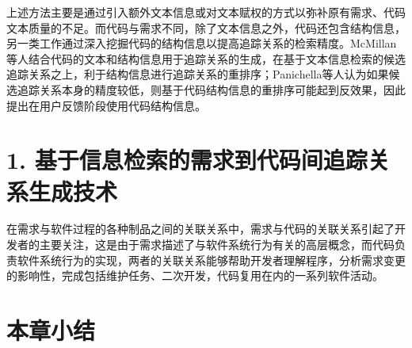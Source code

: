 上述方法主要是通过引入额外文本信息或对文本赋权的方式以弥补原有需求、代码文本质量的不足。而代码与需求不同，除了文本信息之外，代码还包含结构信息，另一类工作通过深入挖掘代码的结构信息以提高追踪关系的检索精度。McMillan等人\cite{mcmillan2009combining}结合代码的文本和结构信息用于追踪关系的生成，在基于文本信息检索的候选追踪关系之上，利于结构信息进行追踪关系的重排序；Panichella等人\cite{panichella2013and}认为如果候选追踪关系本身的精度较低，则基于代码结构信息的重排序可能起到反效果，因此提出在用户反馈阶段使用代码结构信息。

\section{1.	基于信息检索的需求到代码间追踪关系生成技术}

在需求与软件过程的各种制品之间的关联关系中，需求与代码的关联关系引起了开发者的主要关注，这是由于需求描述了与软件系统行为有关的高层概念，而代码负责软件系统行为的实现，两者的关联关系能够帮助开发者理解程序，分析需求变更的影响性，完成包括维护任务、二次开发，代码复用在内的一系列软件活动。


\section{本章小结}


